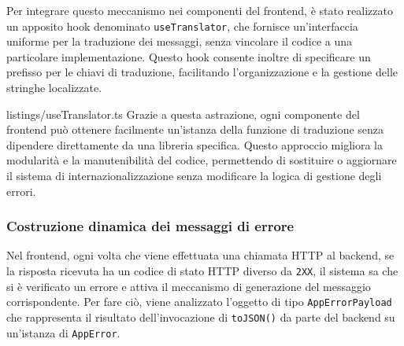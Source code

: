 Per integrare questo meccanismo nei componenti del frontend, è stato realizzato un apposito hook denominato \texttt{useTranslator}, che fornisce un'interfaccia uniforme per la traduzione dei messaggi, senza vincolare il codice a una particolare implementazione. Questo hook consente inoltre di specificare un prefisso per le chiavi di traduzione, facilitando l'organizzazione e la gestione delle stringhe localizzate.


{listings/useTranslator.ts}
%
Grazie a questa astrazione, ogni componente del frontend può ottenere facilmente un’istanza della funzione di traduzione senza dipendere direttamente da una libreria specifica. Questo approccio migliora la modularità e la manutenibilità del codice, permettendo di sostituire o aggiornare il sistema di internazionalizzazione senza modificare la logica di gestione degli errori.

\subsubsection{Costruzione dinamica dei messaggi di errore}
Nel frontend, ogni volta che viene effettuata una chiamata HTTP al backend, se la risposta ricevuta ha un codice di stato HTTP diverso da \texttt{2XX}, il sistema sa che si è verificato un errore e attiva il meccanismo di generazione del messaggio corrispondente. Per fare ciò, viene analizzato l’oggetto di tipo \texttt{AppErrorPayload} che rappresenta il risultato dell'invocazione di \texttt{toJSON()} da parte del backend su un'istanza di \texttt{AppError}.

